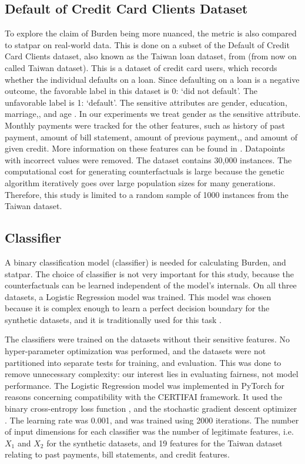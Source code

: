 \documentclass[runningheads]{llncs}
\begin{document}
\subsection{Default of Credit Card Clients Dataset}\label{sec:taiwan}

To explore the claim of \gls{Burden} being more nuanced, the metric is also compared to \gls{statpar} on real-world data. This is done on a subset of the Default of Credit Card Clients dataset, also known as the Taiwan loan dataset, from \cite{dataset} (from now on called Taiwan dataset). This is a dataset of credit card users, which records whether the individual defaults on a loan. Since defaulting on a loan is a negative outcome, the favorable label in this dataset is 0: `did not default'. The unfavorable label is 1: `default'. The sensitive attributes are gender, education, marriage,, and age \cite{eusex}. In our experiments we treat gender as the sensitive attribute. Monthly payments were tracked for the other features, such as history of past payment, amount of bill statement, amount of previous payment,, and amount of given credit. More information on these features can be found in \cite{dataset}. Datapoints with incorrect values were removed. The dataset contains 30,000 instances. The computational cost for generating counterfactuals is large because the genetic algorithm iteratively goes over large population sizes for many generations. Therefore, this study is limited to a random sample of 1000 instances from the Taiwan dataset.


\subsection{Classifier}\label{sec:model}
A binary classification model (classifier) is needed for calculating \gls{Burden}, and \gls{statpar}. The choice of classifier is not very important for this study, because the counterfactuals can be learned independent of the model's internals. On all three datasets, a Logistic Regression model \cite{cox1958regression} was trained. This model was chosen because it is complex enough to learn a perfect decision boundary for the synthetic datasets, and it is traditionally used for this task \cite{crook2007recent}. 

The classifiers were trained on the datasets without their sensitive features. No hyper-parameter optimization was performed, and the datasets were not partitioned into separate tests for training, and evaluation. This was done to remove unnecessary complexity: our interest lies in evaluating fairness, not model performance. The Logistic Regression model was implemented in PyTorch for reasons concerning compatibility with the CERTIFAI framework. It used the binary cross-entropy loss function \cite{cox1958regression}, and the stochastic gradient descent optimizer \cite{robbins1951stochastic}. The learning rate was 0.001, and was trained using 2000 iterations. The number of input dimensions for each classifier was the number of \gls{legitimate} features, i.e. $X_1$ and $X_2$ for the synthetic datasets, and 19 features for the Taiwan dataset relating to past payments, bill statements, and credit features.
\end{document}
